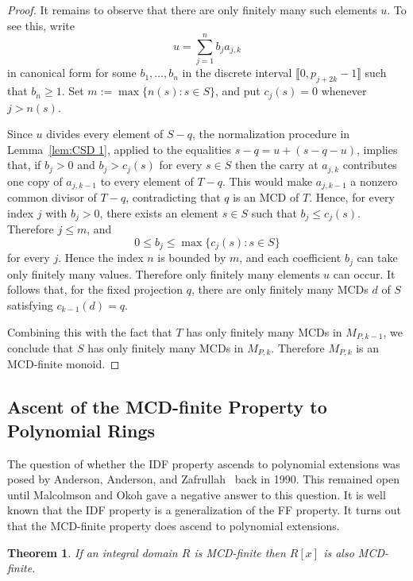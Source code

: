 \documentclass[10pt]{amsart}
\newtheorem{theorem}{Theorem}[section]
\theoremstyle{definition}
\theoremstyle{remark}
\numberwithin{equation}{section}
\providecommand\ldb{\llbracket}
\providecommand\rdb{\rrbracket}
\begin{document}
\begin{proof}
  It remains to observe that there are only finitely many such elements $u$. To see this, write
  \[
    u = \sum_{j=1}^n b_j a_{j,k}
  \]
  in canonical form for some $b_1, \dots, b_n$ in the discrete interval $\ldb 0,p_{j+2k}-1\rdb$ such that $b_n \ge 1$. Set $m := \max \{n(s):s \in S\}$, and put $c_j(s)=0$ whenever $j>n(s)$.

  Since $u$ divides every element of $S-q$, the normalization procedure in Lemma~\ref{lem:CSD 1}, applied to the equalities $s-q=u+(s-q-u)$, implies that, if $b_j>0$ and $b_j>c_j(s)$ for every $s\in S$ then the carry at $a_{j,k}$ contributes one copy of $a_{j,k-1}$ to every element of $T-q$. This would make $a_{j,k-1}$ a nonzero common divisor of $T-q$, contradicting that $q$ is an MCD of $T$. Hence, for every index $j$ with $b_j>0$, there exists an element $s\in S$ such that $b_j\le c_j(s)$. Therefore $j\le m$, and
  \[
    0 \le b_j \le \max \{c_j(s):s\in S\}
  \]
  for every $j$. Hence the index $n$ is bounded by $m$, and each coefficient $b_j$ can take only finitely many values. Therefore only finitely many elements $u$ can occur. It follows that, for the fixed projection $q$, there are only finitely many MCDs $d$ of $S$ satisfying $c_{k-1}(d)=q$.

  Combining this with the fact that $T$ has only finitely many MCDs in $M_{P,k-1}$, we conclude that $S$ has only finitely many MCDs in $M_{P,k}$. Therefore $M_{P,k}$ is an MCD-finite monoid.
\end{proof}


\medskip
\subsection{Ascent of the MCD-finite Property to Polynomial Rings}

The question of whether the IDF property ascends to polynomial extensions was posed by Anderson, Anderson, and Zafrullah~\cite{AAZ90} back in 1990. This remained open until Malcolmson and Okoh gave a negative answer to this question. It is well known that the IDF property is a generalization of the FF property. It turns out that the MCD-finite property does ascend to polynomial extensions.

\begin{theorem}
  If an integral domain $R$ is MCD-finite then $R[x]$ is also MCD-finite.
\end{theorem}
\end{document}
